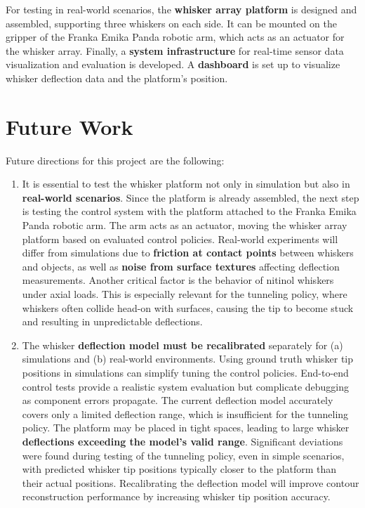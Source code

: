 For testing in real-world scenarios, the \textbf{whisker array platform} is designed and assembled, supporting three whiskers on each side.
It can be mounted on the gripper of the Franka Emika Panda robotic arm, which acts as an actuator for the whisker array.
Finally, a \textbf{system infrastructure} for real-time sensor data visualization and evaluation is developed.
A \textbf{dashboard} is set up to visualize whisker deflection data and the platform's position.


\section{Future Work}
Future directions for this project are the following:
\begin{enumerate}
    \item It is essential to test the whisker platform not only in simulation but also in \textbf{real-world scenarios}.
    Since the platform is already assembled, the next step is testing the control system with the platform attached to the Franka Emika Panda robotic arm.
    The arm acts as an actuator, moving the whisker array platform based on evaluated control policies.
    Real-world experiments will differ from simulations due to \textbf{friction at contact points} between whiskers and objects, as well as \textbf{noise from surface textures} affecting deflection measurements.
    Another critical factor is the behavior of nitinol whiskers under axial loads.
    This is especially relevant for the tunneling policy, where whiskers often collide head-on with surfaces, causing the tip to become stuck and resulting in unpredictable deflections.

    \item The whisker \textbf{deflection model must be recalibrated} separately for (a) simulations and (b) real-world environments.
    Using ground truth whisker tip positions in simulations can simplify tuning the control policies.
    End-to-end control tests provide a realistic system evaluation but complicate debugging as component errors propagate.
    The current deflection model accurately covers only a limited deflection range, which is insufficient for the tunneling policy.
    The platform may be placed in tight spaces, leading to large whisker \textbf{deflections exceeding the model's valid range}.
    Significant deviations were found during testing of the tunneling policy, even in simple scenarios, with predicted whisker tip positions typically closer to the platform than their actual positions.
    Recalibrating the deflection model will improve contour reconstruction performance by increasing whisker tip position accuracy.
\end{enumerate}


